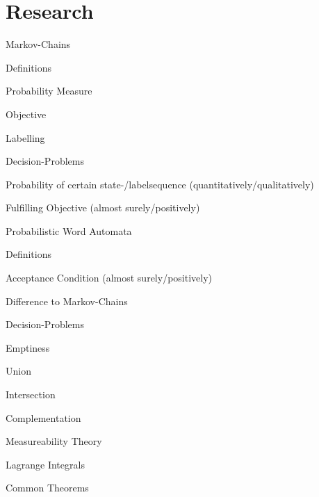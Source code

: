 \documentclass{scrartcl}
\begin{document}
\section{Research}
\begin{checklist}
\item Markov-Chains
  \begin{checklist}
  \item Definitions
    \begin{checklist}
    \item Probability Measure
    \item Objective
    \item Labelling
    \end{checklist}
  \item Decision-Problems
    \begin{checklist}
    \item Probability of certain state-/labelsequence (quantitatively/qualitatively)
    \item Fulfilling Objective (almost surely/positively)
    \end{checklist}
  \end{checklist}
\item Probabilistic Word Automata
  \begin{checklist}
  \item Definitions
    \begin{checklist}
    \item Acceptance Condition (almost surely/positively)
    \item Difference to Markov-Chains
    \end{checklist}
  \item Decision-Problems
    \begin{checklist}
    \item Emptiness
    \item Union
    \item Intersection
    \item Complementation
    \end{checklist}
  \end{checklist}
\item Measureability Theory
  \begin{checklist}
  \item Lagrange Integrals
  \item Common Theorems
  \end{checklist}
\end{checklist}
\end{document}
